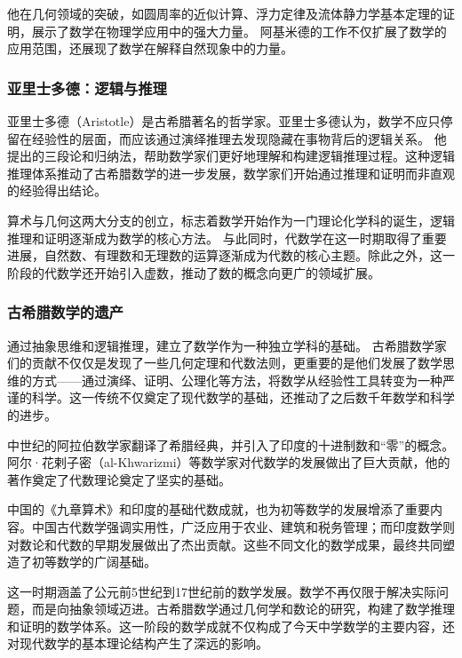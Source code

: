 他在几何领域的突破，如圆周率的近似计算、浮力定律及流体静力学基本定理的证明，展示了数学在物理学应用中的强大力量。
阿基米德的工作不仅扩展了数学的应用范围，还展现了数学在解释自然现象中的力量。

\subsubsection*{亚里士多德：逻辑与推理}

亚里士多德（Aristotle）是古希腊著名的哲学家。亚里士多德认为，数学不应只停留在经验性的层面，而应该通过演绎推理去发现隐藏在事物背后的逻辑关系。
他提出的三段论和归纳法，帮助数学家们更好地理解和构建逻辑推理过程。这种逻辑推理体系推动了古希腊数学的进一步发展，数学家们开始通过推理和证明而非直观的经验得出结论。



算术与几何这两大分支的创立，标志着数学开始作为一门理论化学科的诞生，逻辑推理和证明逐渐成为数学的核心方法。
与此同时，代数学在这一时期取得了重要进展，自然数、有理数和无理数的运算逐渐成为代数的核心主题。除此之外，这一阶段的代数学还开始引入虚数，推动了数的概念向更广的领域扩展。

\subsubsection*{古希腊数学的遗产}

通过抽象思维和逻辑推理，建立了数学作为一种独立学科的基础。
古希腊数学家们的贡献不仅仅是发现了一些几何定理和代数法则，更重要的是他们发展了数学思维的方式——通过演绎、证明、公理化等方法，将数学从经验性工具转变为一种严谨的科学。这一传统不仅奠定了现代数学的基础，还推动了之后数千年数学和科学的进步。


中世纪的阿拉伯数学家翻译了希腊经典，并引入了印度的十进制数和“零”的概念。阿尔·花剌子密（al-Khwarizmi）等数学家对代数学的发展做出了巨大贡献，他的著作奠定了代数理论奠定了坚实的基础。

中国的《九章算术》和印度的基础代数成就，也为初等数学的发展增添了重要内容。中国古代数学强调实用性，广泛应用于农业、建筑和税务管理；而印度数学则对数论和代数的早期发展做出了杰出贡献。这些不同文化的数学成果，最终共同塑造了初等数学的广阔基础。

这一时期涵盖了公元前5世纪到17世纪前的数学发展。数学不再仅限于解决实际问题，而是向抽象领域迈进。古希腊数学通过几何学和数论的研究，构建了数学推理和证明的数学体系。这一阶段的数学成就不仅构成了今天中学数学的主要内容，还对现代数学的基本理论结构产生了深远的影响。




